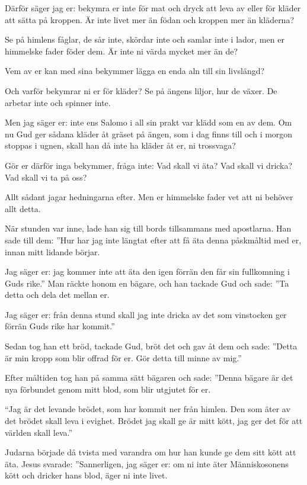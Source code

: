 
Därför säger jag er: bekymra er inte för mat och dryck att leva av eller för kläder att sätta på kroppen. Är inte livet mer än födan och kroppen mer än kläderna?

Se på himlens fåglar, de sår inte, skördar inte och samlar inte i lador, men er himmelske fader föder dem. Är inte ni värda mycket mer än de?

Vem av er kan med sina bekymmer lägga en enda aln till sin livslängd?

Och varför bekymrar ni er för kläder? Se på ängens liljor, hur de växer. De arbetar inte och spinner inte.

Men jag säger er: inte ens Salomo i all sin prakt var klädd som en av dem.
Om nu Gud ger sådana kläder åt gräset på ängen, som i dag finns till och i morgon stoppas i ugnen, skall han då inte ha kläder åt er, ni trossvaga?

Gör er därför inga bekymmer, fråga inte: Vad skall vi äta? Vad skall vi dricka? Vad skall vi ta på oss?

Allt sådant jagar hedningarna efter. Men er himmelske fader vet att ni behöver allt detta.


{När stunden var inne, lade han sig till bords tillsammans med apostlarna.}
Han sade till dem: ''Hur har jag inte längtat efter att få äta denna påskmåltid med er, innan mitt lidande börjar.

Jag säger er: jag kommer inte att äta den igen förrän den får sin fullkomning i Guds rike.''
Man räckte honom en bägare, och han tackade Gud och sade: ''Ta detta och dela det mellan er.

Jag säger er: från denna stund skall jag inte dricka av det som vinstocken ger förrän Guds rike har kommit.''

Sedan tog han ett bröd, tackade Gud, bröt det och gav åt dem och sade: ''Detta är min kropp som blir offrad för er. Gör detta till minne av mig.''

Efter måltiden tog han på samma sätt bägaren och sade: ''Denna bägare är det nya förbundet genom mitt blod, som blir utgjutet för er.
 
{``Jag är det levande brödet, som har kommit ner från himlen. Den som äter av det brödet skall leva i evighet. Brödet jag skall ge är mitt kött, jag ger det för att världen skall leva.''}

Judarna började då tvista med varandra om hur han kunde ge dem sitt kött att äta.
Jesus svarade: ''Sannerligen, jag säger er: om ni inte äter Människosonens kött och dricker hans blod, äger ni inte livet.

